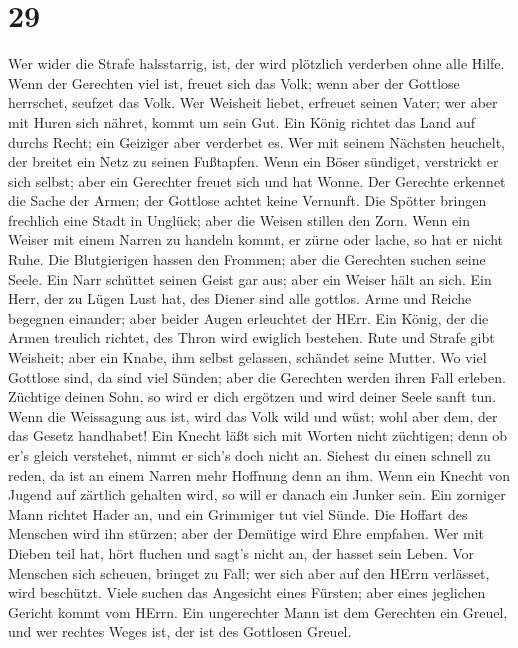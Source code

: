 \hypertarget{section-28}{%
\section{29}\label{section-28}}

 Wer wider die Strafe halsstarrig, ist, der wird plötzlich
verderben ohne alle Hilfe.  Wenn der Gerechten viel ist,
freuet sich das Volk; wenn aber der Gottlose herrschet, seufzet das
Volk.  Wer Weisheit liebet, erfreuet seinen Vater; wer aber
mit Huren sich nähret, kommt um sein Gut.  Ein König richtet
das Land auf durchs Recht; ein Geiziger aber verderbet es. 
Wer mit seinem Nächsten heuchelt, der breitet ein Netz zu seinen
Fußtapfen.  Wenn ein Böser sündiget, verstrickt er sich
selbst; aber ein Gerechter freuet sich und hat Wonne.  Der
Gerechte erkennet die Sache der Armen; der Gottlose achtet keine
Vernunft.  Die Spötter bringen frechlich eine Stadt in
Unglück; aber die Weisen stillen den Zorn.  Wenn ein Weiser
mit einem Narren zu handeln kommt, er zürne oder lache, so hat er nicht
Ruhe.  Die Blutgierigen hassen den Frommen; aber die
Gerechten suchen seine Seele.  Ein Narr schüttet seinen
Geist gar aus; aber ein Weiser hält an sich.  Ein Herr, der
zu Lügen Lust hat, des Diener sind alle gottlos.  Arme und
Reiche begegnen einander; aber beider Augen erleuchtet der HErr.
 Ein König, der die Armen treulich richtet, des Thron wird
ewiglich bestehen.  Rute und Strafe gibt Weisheit; aber ein
Knabe, ihm selbst gelassen, schändet seine Mutter.  Wo viel
Gottlose sind, da sind viel Sünden; aber die Gerechten werden ihren Fall
erleben.  Züchtige deinen Sohn, so wird er dich ergötzen
und wird deiner Seele sanft tun.  Wenn die Weissagung aus
ist, wird das Volk wild und wüst; wohl aber dem, der das Gesetz
handhabet!  Ein Knecht läßt sich mit Worten nicht
züchtigen; denn ob er's gleich verstehet, nimmt er sich's doch nicht an.
 Siehest du einen schnell zu reden, da ist an einem Narren
mehr Hoffnung denn an ihm.  Wenn ein Knecht von Jugend auf
zärtlich gehalten wird, so will er danach ein Junker sein. 
Ein zorniger Mann richtet Hader an, und ein Grimmiger tut viel Sünde.
 Die Hoffart des Menschen wird ihn stürzen; aber der
Demütige wird Ehre empfahen.  Wer mit Dieben teil hat, hört
fluchen und sagt's nicht an, der hasset sein Leben.  Vor
Menschen sich scheuen, bringet zu Fall; wer sich aber auf den HErrn
verlässet, wird beschützt.  Viele suchen das Angesicht
eines Fürsten; aber eines jeglichen Gericht kommt vom HErrn.
 Ein ungerechter Mann ist dem Gerechten ein Greuel, und wer
rechtes Weges ist, der ist des Gottlosen Greuel.

